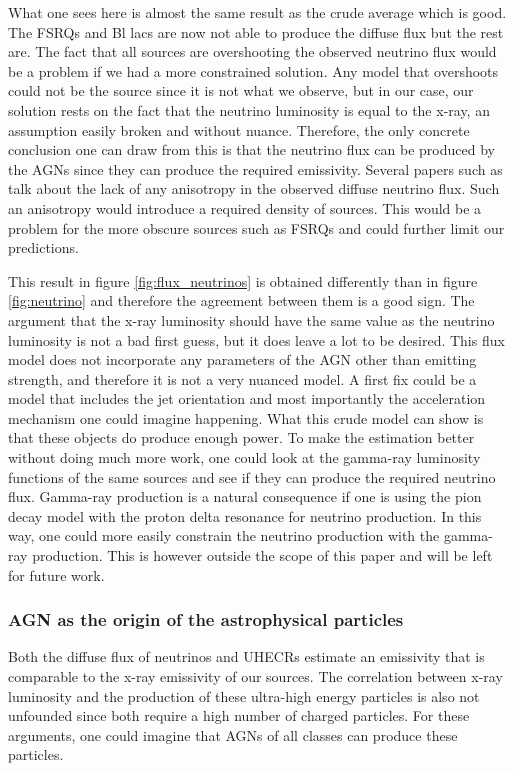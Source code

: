 What one sees here is almost the same result as the crude average which is good. The FSRQs and Bl lacs are now not able to produce the diffuse flux but the rest are. 
The fact that all sources are overshooting the observed neutrino flux would be a problem if we had a more constrained solution. Any model that overshoots could not be the source since it is not what we observe, but in our case, 
our solution rests on the fact that the neutrino luminosity is equal to the x-ray, an assumption easily broken and without nuance. Therefore, the only concrete conclusion one can draw from this is that the neutrino flux can be produced by the AGNs since they can produce the required emissivity.
Several papers such as \cite{Kurahashi_2022} talk about the lack of any anisotropy in the observed diffuse neutrino flux. Such an anisotropy would introduce a required density of sources. This would be a problem for the more obscure sources such as FSRQs and could further limit our predictions.

This result in figure \ref*{fig:flux_neutrinos} is obtained differently than in figure \ref*{fig:neutrino} and therefore the agreement between them is a good sign. The argument that the x-ray luminosity should have the same value as the neutrino luminosity is not a bad first guess, but it does leave a lot to be desired. 
This flux model does not incorporate any parameters of the AGN other than emitting strength, and therefore it is not a very nuanced model. A first fix could be a model that includes the jet orientation and most importantly the acceleration mechanism one could imagine happening. What this 
crude model can show is that these objects do produce enough power. To make the estimation better without doing much more work, one could look at the gamma-ray luminosity functions of the same sources and see if they can produce the required neutrino flux. Gamma-ray production is a natural consequence if one is using the pion decay model with the proton delta resonance
for neutrino production. In this way, one could more easily constrain the neutrino production with the gamma-ray production. 
This is however outside the scope of this paper and will be left for future work. 

\subsubsection{AGN as the origin of the astrophysical particles}
Both the diffuse flux of neutrinos and UHECRs estimate an emissivity that is comparable to the x-ray emissivity of our sources. The correlation between x-ray luminosity and the production of these ultra-high energy 
particles is also not unfounded since both require a high number of charged particles. For these arguments, one could imagine that AGNs of all classes can produce these particles. 

